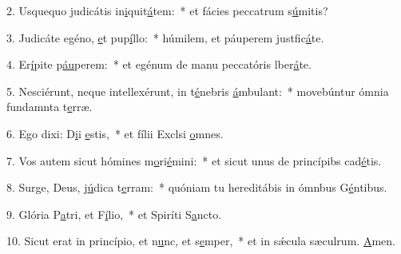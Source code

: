 2. Usquequo judicátis in\uline{i}quit\uline{á}tem:~* et fácies peccatrum s\uline{ú}mitis?\par 
3. Judicáte egéno, \uline{e}t pup\uline{í}llo:~* húmilem, et páuperem justfic\uline{á}te.\par 
4. Er\uline{í}pite p\uline{áu}perem:~* et egénum de manu peccatóris lber\uline{á}te.\par 
5. Nesciérunt, neque intellexérunt, in t\uline{é}nebris \uline{á}mbulant:~* movebúntur ómnia fundamnta t\uline{e}rræ.\par 
6. Ego dixi: D\uline{i}i \uline{e}stis,~* et fílii Exclsi \uline{o}mnes.\par 
7. Vos autem sicut hómines m\uline{o}ri\uline{é}mini:~* et sicut unus de princípibs cad\uline{é}tis.\par 
8. Surge, Deus, j\uline{ú}dica t\uline{e}rram:~* quóniam tu hereditábis in ómnbus G\uline{é}ntibus.\par 
9. Glória P\uline{a}tri, et F\uline{í}lio,~* et Spiríti S\uline{a}ncto.\par 
10. Sicut erat in princípio, et n\uline{u}nc, et s\uline{e}mper,~* et in sǽcula sæculrum. \uline{A}men.\par 
